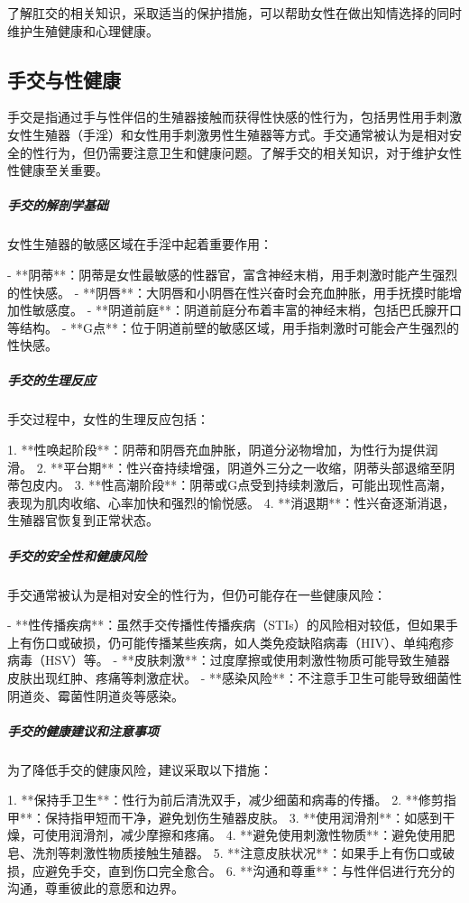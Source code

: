 \begin{enumerate}
了解肛交的相关知识，采取适当的保护措施，可以帮助女性在做出知情选择的同时维护生殖健康和心理健康。

\subsection{手交与性健康}

手交是指通过手与性伴侣的生殖器接触而获得性快感的性行为，包括男性用手刺激女性生殖器（手淫）和女性用手刺激男性生殖器等方式。手交通常被认为是相对安全的性行为，但仍需要注意卫生和健康问题。了解手交的相关知识，对于维护女性性健康至关重要。

\subparagraph{手交的解剖学基础}

女性生殖器的敏感区域在手淫中起着重要作用：

- **阴蒂**：阴蒂是女性最敏感的性器官，富含神经末梢，用手刺激时能产生强烈的性快感。
- **阴唇**：大阴唇和小阴唇在性兴奋时会充血肿胀，用手抚摸时能增加性敏感度。
- **阴道前庭**：阴道前庭分布着丰富的神经末梢，包括巴氏腺开口等结构。
- **G点**：位于阴道前壁的敏感区域，用手指刺激时可能会产生强烈的性快感。

\subparagraph{手交的生理反应}

手交过程中，女性的生理反应包括：

1. **性唤起阶段**：阴蒂和阴唇充血肿胀，阴道分泌物增加，为性行为提供润滑。
2. **平台期**：性兴奋持续增强，阴道外三分之一收缩，阴蒂头部退缩至阴蒂包皮内。
3. **性高潮阶段**：阴蒂或G点受到持续刺激后，可能出现性高潮，表现为肌肉收缩、心率加快和强烈的愉悦感。
4. **消退期**：性兴奋逐渐消退，生殖器官恢复到正常状态。

\subparagraph{手交的安全性和健康风险}

手交通常被认为是相对安全的性行为，但仍可能存在一些健康风险：

- **性传播疾病**：虽然手交传播性传播疾病（STIs）的风险相对较低，但如果手上有伤口或破损，仍可能传播某些疾病，如人类免疫缺陷病毒（HIV）、单纯疱疹病毒（HSV）等。
- **皮肤刺激**：过度摩擦或使用刺激性物质可能导致生殖器皮肤出现红肿、疼痛等刺激症状。
- **感染风险**：不注意手卫生可能导致细菌性阴道炎、霉菌性阴道炎等感染。

\subparagraph{手交的健康建议和注意事项}

为了降低手交的健康风险，建议采取以下措施：

1. **保持手卫生**：性行为前后清洗双手，减少细菌和病毒的传播。
2. **修剪指甲**：保持指甲短而干净，避免划伤生殖器皮肤。
3. **使用润滑剂**：如感到干燥，可使用润滑剂，减少摩擦和疼痛。
4. **避免使用刺激性物质**：避免使用肥皂、洗剂等刺激性物质接触生殖器。
5. **注意皮肤状况**：如果手上有伤口或破损，应避免手交，直到伤口完全愈合。
6. **沟通和尊重**：与性伴侣进行充分的沟通，尊重彼此的意愿和边界。


\end{enumerate}
